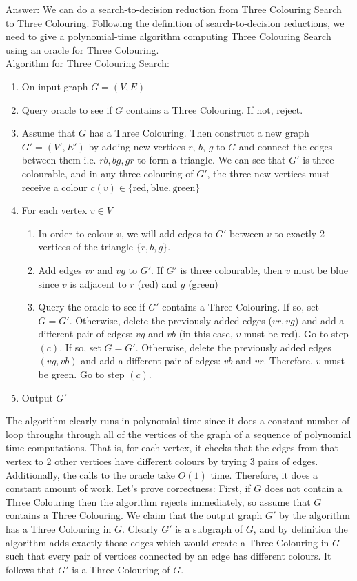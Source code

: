 \documentclass{csc_assignment}
\begin{document}
\begin{description}
  Answer: We can do a search-to-decision reduction from Three Colouring Search to Three Colouring. Following the definition of search-to-decision reductions, we need to give a polynomial-time algorithm computing Three Colouring Search using an oracle for Three Colouring. \\ Algorithm for Three Colouring Search: \begin{enumerate}
  \item On input graph $G = (V, E)$
  \item Query oracle to see if $G$ contains a Three Colouring. If not, reject.
  \item Assume that $G$ has a Three Colouring. Then construct a new graph $G' = (V', E')$ by adding new vertices $r$, $b$, $g$ to $G$ and connect the edges between them i.e. $rb, bg, gr$ to form a triangle. We can see that $G'$ is three colourable, and in any three colouring of $G'$, the three new vertices must receive a colour $c(v) \in \{\mathrm{red}, \mathrm{blue}, \mathrm{green}\}$
  \item For each vertex $v \in V$
  \begin{enumerate}
  \item In order to colour $v$, we will add edges to $G'$ between $v$ to exactly 2 vertices of the triangle $\{r, b, g\}$. 
  \item Add edges $vr$ and $vg$ to $G'$. If $G'$ is three colourable, then $v$ must be blue since $v$ is adjacent to $r$ (red) and $g$ (green)
  \item Query the oracle to see if $G'$ contains a Three Colouring. If so, set $G = G'$. Otherwise, delete the previously added edges ($vr, vg$) and add a different pair of edges: $vg$ and $vb$ (in this case, $v$ must be red). Go to step $(c)$. If so, set $G = G'$. Otherwise, delete the previously added edges $(vg, vb)$ and add a different pair of edges: $vb$ and $vr$. Therefore, $v$ must be green. Go to step $(c)$.
  \end{enumerate}
  \item Output $G'$
  \end{enumerate}
  The algorithm clearly runs in polynomial time since it does a constant number of loop throughs through all of the vertices of the graph of a sequence of polynomial time computations. That is, for each vertex, it checks that the edges from that vertex to 2 other vertices have different colours by trying 3 pairs of edges. Additionally, the calls to the oracle take $O(1)$ time. Therefore, it does a constant amount of work. Let's prove correctness: First, if $G$ does not contain a Three Colouring then the algorithm rejects immediately, so assume that $G$ contains a Three Colouring. We claim that the output graph $G'$ by the algorithm has a Three Colouring in $G$. Clearly $G'$ is a subgraph of $G$, and by definition the algorithm adds exactly those edges which would create a Three Colouring in $G$ such that every pair of vertices connected by an edge has different colours. It follows that $G'$ is a Three Colouring of $G$. 
  

\end{description}
\end{document}
